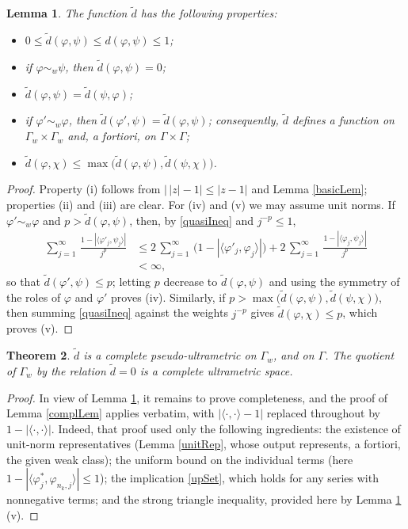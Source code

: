\documentclass[twoside,11pt,letter]{article}
\newtheorem{theorem}{Theorem}[section]
\theoremstyle{definition}
\theoremstyle{definition}
\theoremstyle{plain}
\newtheorem{lemma}[theorem]{Lemma}
\begin{document}
\begin{lemma}\label{tdLem}
The function $\tilde d$ has the following properties:
\begin{itemize}
\item[(i)]{$0\leq\tilde d(\varphi,\psi)\leq d(\varphi,\psi)\leq1$;}
\item[(ii)]{if $\varphi\sim_w\psi$, then $\tilde d(\varphi,\psi)=0$;}
\item[(iii)]{$\tilde d(\varphi,\psi)=\tilde d(\psi,\varphi)$;}
\item[(iv)]{if $\varphi'\sim_w\varphi$, then $\tilde d(\varphi',\psi)=\tilde d(\varphi,\psi)$; consequently, $\tilde d$ defines a function on $\Gamma_w\times\Gamma_w$ and, a fortiori, on $\Gamma\times\Gamma$;}
\item[(v)]{$\tilde d(\varphi,\chi)\leq\max\big(\tilde d(\varphi,\psi),\tilde d(\psi,\chi)\big)$.}
\end{itemize}
\end{lemma}
\begin{proof}
Property (i) follows from $\big|\,|z|-1\big|\leq|z-1|$ and Lemma \ref{basicLem}; properties (ii) and (iii) are clear. For (iv) and (v) we may assume unit norms. If $\varphi'\sim_w\varphi$ and $p>\tilde d(\varphi,\psi)$, then, by \eqref{quasiIneq} and $j^{-p}\leq1$,
\begin{equation*}
\begin{split}
\sum_{j=1}^\infty\,\frac{1-|\langle\varphi'_j,\psi_j\rangle|}{j^p}
&\leq 2\,\sum_{j=1}^\infty\,\big(1-|\langle\varphi'_j,\varphi_j\rangle|\big)
+2\,\sum_{j=1}^\infty\,\frac{1-|\langle\varphi_j,\psi_j\rangle|}{j^p}\\
&<\infty,
\end{split}
\end{equation*}
so that $\tilde d(\varphi',\psi)\leq p$; letting $p$ decrease to $\tilde d(\varphi,\psi)$ and using the symmetry of the roles of $\varphi$ and $\varphi'$ proves (iv). Similarly, if $p>\max\big(\tilde d(\varphi,\psi),\tilde d(\psi,\chi)\big)$, then summing \eqref{quasiIneq} against the weights $j^{-p}$ gives $\tilde d(\varphi,\chi)\leq p$, which proves (v).
\end{proof}

\begin{theorem}\label{tdThm}
$\tilde d$ is a complete pseudo-ultrametric on $\Gamma_w$, and on $\Gamma$. The quotient of $\Gamma_w$ by the relation $\tilde d=0$ is a complete ultrametric space.
\end{theorem}
\begin{proof}
In view of Lemma \ref{tdLem}, it remains to prove completeness, and the proof of Lemma \ref{complLem} applies verbatim, with $|\langle\cdot,\cdot\rangle-1|$ replaced throughout by $1-|\langle\cdot,\cdot\rangle|$. Indeed, that proof used only the following ingredients: the existence of unit-norm representatives (Lemma \ref{unitRep}, whose output represents, a fortiori, the given weak class); the uniform bound on the individual terms (here $1-|\langle\varphi^\ast_j,\varphi_{n_k,j}\rangle|\leq1$); the implication \eqref{upSet}, which holds for any series with nonnegative terms; and the strong triangle inequality, provided here by Lemma \ref{tdLem} (v).
\end{proof}
\end{document}
